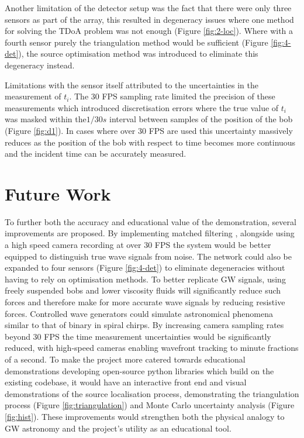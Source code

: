 Another limitation of the detector setup was the fact that there were only three sensors as part of the array, this resulted in degeneracy issues where one method for solving the TDoA problem was not enough (Figure \ref{fig:2-loc}). Where with a fourth sensor purely the triangulation method would be sufficient (Figure \ref{fig:4-det}), the source optimisation method was introduced to eliminate this degeneracy instead.

Limitations with the sensor itself attributed to the uncertainties in the measurement of $t_i$. The 30 FPS sampling rate limited the precision of these measurements which introduced discretisation errors where the true value of $t_i$ was masked within the$ 1/30s$ interval between samples of the position of the bob (Figure \ref{fig:d1}). In cases where over 30 FPS are used this uncertainty massively reduces as the position of the bob with respect to time becomes more continuous and the incident time can be accurately measured.

\section{Future Work}
To further both the accuracy and educational value of the demonstration, several improvements are proposed. By implementing matched filtering \cite{Schutz_1999}, alongside using a high speed camera recording at over 30 FPS the system would be better equipped to distinguish true wave signals from noise. The network could also be expanded to four sensors (Figure \ref{fig:4-det}) to eliminate degeneracies without having to rely on optimisation methods. To better replicate GW signals, using freely suspended bobs and lower viscosity fluids will significantly reduce such forces and therefore make for more accurate wave signals by reducing resistive forces. Controlled wave generators could simulate astronomical phenomena similar to that of binary in spiral chirps. By increasing camera sampling rates beyond 30 FPS the time measurement uncertainties would be significantly reduced, with high-speed cameras enabling wavefront tracking to minute fractions of a second. To make the project more catered towards educational demonstrations developing open-source python libraries which build on the existing codebase, it would have an interactive front end and visual demonstrations of the source localisation process, demonstrating the triangulation process (Figure \ref{fig:triangulation}) and Monte Carlo uncertainty analysis (Figure \ref{fig:hist}). These improvements would strengthen both the physical analogy to GW astronomy and the project's utility as an educational tool.